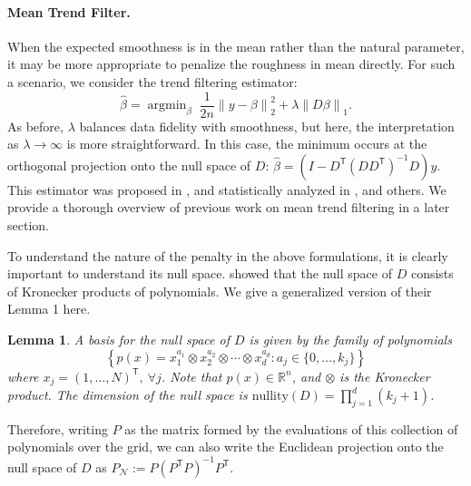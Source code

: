 \documentclass[ejs,noshowframe]{imsart}
\theoremstyle{plain}
\newtheorem{lemma}[theorem]{Lemma}
\theoremstyle{definition}
\DeclareMathOperator*{\argmin}{argmin}
\newcommand{\norm}[1]{\left\lVert #1 \right\rVert}
\newcommand{\R}{\mathbb{R}}
\newcommand{\cN}{\mathcal{N}}
\renewcommand{\hat}{\widehat}
\renewcommand{\top}{\mathsf{T}}
\begin{document}
\paragraph*{Mean Trend Filter.}
When the expected smoothness is in the mean rather than the natural parameter, 
it may be more appropriate to penalize the roughness in mean directly.
For such a scenario,
we consider the trend filtering estimator:
\begin{equation}
\label{eq:lsq}
  \hat \beta = \argmin_\beta  \; \frac{1}{2n} \norm{ y - \beta }_2^2 +
  \lambda \norm{D\beta}_1.
\end{equation}
As before, $\lambda$ balances data fidelity with smoothness, but here, the
interpretation as $\lambda\rightarrow\infty$ is more straightforward. In this
case, the
minimum occurs at the orthogonal projection onto the null space of $D$:
$\hat\beta = (I - D^\top(DD^\top)^{-1}D)y$.
This estimator was proposed in \cite{steidl2006splines}, \cite{KimKoh2009} and
statistically analyzed in \cite{tibshirani2014adaptive},
\cite{WangSharpnack2016} and others. We provide a thorough overview of previous
work on mean trend filtering in a later section.

To understand the nature of the penalty in the above formulations,
it is clearly important to understand its null space.  \cite{SadhanalaWang2017}
showed 
that the null space of $D$ consists of Kronecker products of polynomials. We
give a  
generalized version of their Lemma 1 here.
\begin{lemma}
  A basis for the null space of $D$ is given by the family of polynomials
  \[
   \left\{p(x) = x_1^{a_1}\otimes x_2^{a_2}\otimes\cdots\otimes x_d^{a_d} :
     a_j \in \{0,\ldots,k_j\}\right\}
  \]
  where $x_j = (1,\ldots,N)^\top,\ \forall j$. Note that $p(x)\in \R^{n}$, and $\otimes$ is
  the Kronecker product. The dimension of the null
  space is $\mathrm{nullity}(D) = \prod_{j=1}^d (k_j+1)$.
\end{lemma}
Therefore, writing $P$ as the matrix formed by the evaluations of this 
collection of polynomials over the grid,
we can  
also write the Euclidean projection onto the null space of $D$ as $P_\cN := P(P^\top
P)^{-1}P^\top$.  

\end{document}
